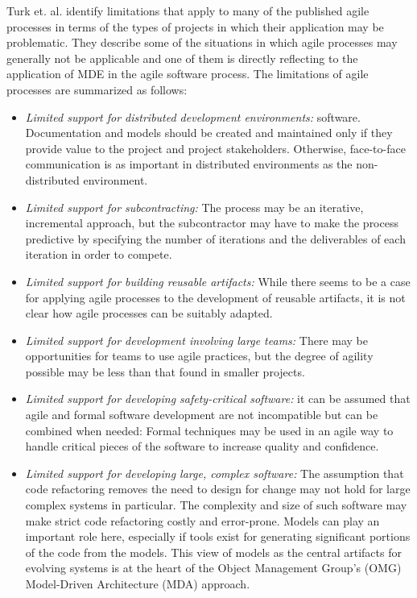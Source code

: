 \documentclass[10pt, a4paper, twocolumn]{article}
\begin{document}
Turk et. al. \cite{TurkFR14} identify limitations that apply to many of the published agile processes in terms of the types of projects in which their application may be problematic. They describe some of the situations in which agile processes may generally not be applicable and one of them is directly reflecting to the application of MDE in the agile software process. The limitations of agile processes are summarized as follows:

\begin{itemize}
\item \emph{Limited support for distributed development environments:} software. Documentation and models should be created and maintained only if they provide value to the project and project stakeholders. Otherwise, face-to-face communication is as important in distributed environments as the non-distributed environment.
\item \emph{Limited support for subcontracting:} The process may be an iterative, incremental approach, but the subcontractor may have to make the process predictive by specifying the number of iterations and the deliverables of each iteration in order to compete.
\item \emph{Limited support for building reusable artifacts:} While there seems to be a case for applying agile processes to the development of reusable artifacts, it is not clear how agile processes can be suitably adapted.
\item \emph{Limited support for development involving large teams:} There may be opportunities for teams to use agile practices, but the degree of agility possible may be less than that found in smaller projects.
\item \emph{Limited support for developing safety-critical software:} it can be assumed that agile and formal software development are not incompatible but can be combined when needed: Formal techniques may be used in an agile way to handle critical pieces of the software to increase quality and confidence.
\item \emph{Limited support for developing large, complex software:} The assumption that code refactoring removes the need to design for change may not hold for large complex systems in particular. The complexity and size of such software may make strict code refactoring costly and error-prone. Models can play an important role here, especially if tools exist for generating significant portions of the code from the models. This view of models as the central artifacts for evolving systems is at the heart of the Object Management Group’s (OMG) Model-Driven Architecture (MDA) approach.
\end{itemize}
\end{document}
